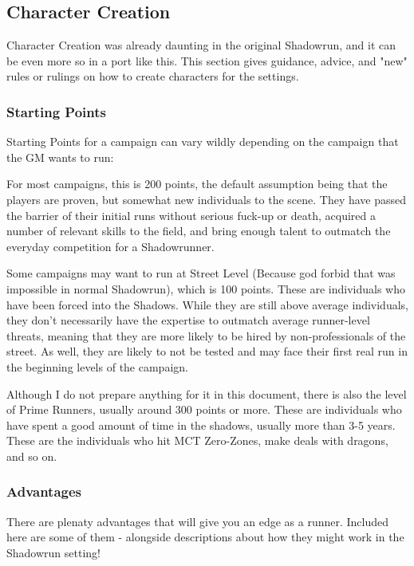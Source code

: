 \begin{multicols*}{3}
	\subsection{Character Creation}
	
	Character Creation was already daunting in the original Shadowrun, and it can be even more so in a port like this. This section gives guidance, advice, and "new" rules or rulings on how to create characters for the settings.
	
	\subsubsection{Starting Points}
	
	Starting Points for a campaign can vary wildly depending on the campaign that the GM wants to run: 
	
	For most campaigns, this is 200 points, the default assumption being that the players are proven, but somewhat new individuals to the scene. They have passed the barrier of their initial runs without serious fuck-up or death, acquired a number of relevant skills to the field, and bring enough talent to outmatch the everyday competition for a Shadowrunner.
	
	Some campaigns may want to run at Street Level (Because god forbid that was impossible in normal Shadowrun), which is 100 points. These are individuals who have been forced into the Shadows. While they are still above average individuals, they don't necessarily have the expertise to outmatch average runner-level threats, meaning that they are more likely to be hired by non-professionals of the street. As well, they are likely to not be tested and may face their first real run in the beginning levels of the campaign.
	
	Although I do not prepare anything for it in this document, there is also the level of Prime Runners, usually around 300 points or more. These are individuals who have spent a good amount of time in the shadows, usually more than 3-5 years. These are the individuals who hit MCT Zero-Zones, make deals with dragons, and so on.
	
	\subsubsection{Advantages}
	
	There are plenaty advantages that will give you an edge as a runner. Included here are some of them - alongside descriptions about how they might work in the Shadowrun setting!
	

\end{multicols*}
